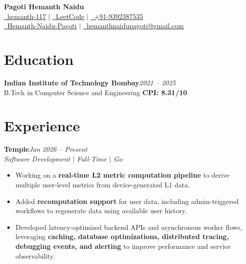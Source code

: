 \documentclass[10pt,a4paper]{article}
\newcommand{\resumeSection}[1]{
    \section*{#1}
}
\newcommand{\resumeEntry}[2]{
    \textbf{#1}\hfill{\small\textit{#2}}\\
}
\newcommand{\resumeSubheading}[1]{
    {\small\textit{#1}}\par
}
\begin{document}


\begin{center}
    {\LARGE\textbf{Pagoti Hemanth Naidu}}\\[6pt]

    \small
    \href{https://github.com/hemanth-117}
    {\faGithub\ hemanth-117}
    \quad $|$ \quad
    \href{https://leetcode.com/u/h210050117/}
    {\faCode\ LeetCode}
    \quad $|$ \quad
    \href{tel:+91-9392387535}
    {\faPhone\ +91-9392387535}
    \\[4pt]

    \href{https://www.linkedin.com/in/hemanth-naidu-pagoti-06727a28a/}
    {\faLinkedin\ Hemanth-Naidu-Pagoti}
    \quad $|$ \quad
    \href{mailto:hemanthnaidupagoti@gmail.com}
    {\faEnvelope\ hemanthnaidupagoti@gmail.com}
\end{center}
\vspace{-5pt}


\resumeSection{Education}

\resumeEntry{Indian Institute of Technology Bombay}{2021 -- 2025}
B.Tech in Computer Science and Engineering
\hfill \textbf{CPI: 8.31/10}


\resumeSection{Experience}

\resumeEntry{Temple}{Jan 2026 -- Present}
\resumeSubheading{Software Development $|$ Full-Time $|$ Go}

\begin{itemize}
    \item Working on a \textbf{real-time L2 metric computation pipeline} to derive multiple user-level metrics from device-generated L1 data.

    \item Added \textbf{recomputation support} for user data, including admin-triggered workflows to regenerate data using available user history.

    \item Developed latency-optimized backend APIs and asynchronous worker flows, leveraging \textbf{caching, database optimizations, distributed tracing, debugging events, and alerting} to improve performance and service observability.
\end{itemize}
\end{document}
